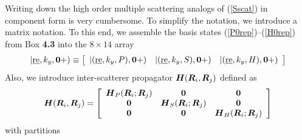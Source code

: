 \begin{figure}
{\begin{minipage} {145.0mm}
\end{minipage}
}
\end{figure}



Writing down the high order multiple scattering analogs of (\ref{Sscat}) in 
component form is very cumbersome. To simplify the notation, we introduce 
a matrix notation.
To this end, we assemble the basis states (\ref{P0rep})--(\ref{H0rep}) 
from {\sc Box} {\bf 4.3} into the $8 
\times 14$
array
\begin{equation} \label{Bab0aug}
|\re,k_y,{\bf 0}+)\equiv \left[ \begin{array}{ccc} |(\re,k_y,P),{\bf 0+}) & 
|(\re,k_y,S),{\bf 0+}) & |(\re,k_y,H),{\bf 0+}) \end{array}\right]
\end{equation}
Also, we introduce inter-scatterer propagator ${{\bmi  H}}({\bmi  
R}_{i},{\bmi  R}_{j})$ defined as
\begin{equation} \label{Pdef1}
{{\bmi  H}}({\bmi  R}_{i},{\bmi  R}_{j})=
\left[{\begin{array}{ccc}{\bmi H}_{P}({\bmi R}_{i};{\bmi R}_{j})&{\bf 0}&{\bf 0}\\
{\bf 0}&{\bmi H}_{S}({\bmi R}_{i};{\bmi R}_{j})&{\bf 0}\\
{\bf 0}&{\bf 0}&{\bmi H}_{H}({\bmi R}_{i};{\bmi R}_{j})\end{array}}\right]
\end{equation}
with partitions
